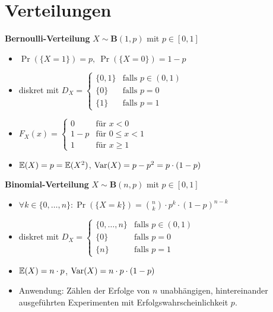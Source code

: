 \section{Verteilungen}

\textbf{Bernoulli-Verteilung} $X\sim\mathbf{B}(1,p)$ mit $p \in [0,1]$
\begin{itemize}
\item $\Pr(\{X=1\}) = p,\ \Pr(\{X=0\}) = 1-p$

\item diskret mit $D_X = \begin{cases}
  \{0,1\}  & \text{falls } p \in (0,1) \\
  \{0\}    & \text{falls } p = 0       \\
  \{1\}    & \text{falls } p = 1
  \end{cases}$

\item $F_X(x) = \begin{cases}
  0    & \text{für } x < 0        \\
  1-p  & \text{für } 0 \leq x <1  \\
  1    & \text{für } x \geq 1
  \end{cases}$

\item $\mathbb{E}(X) = p = \mathbb{E}(X^2)$, $\operatorname{Var}(X) = p-p^2 = p \cdot (1-p)$

\end{itemize}

\textbf{Binomial-Verteilung} $X\sim\mathbf{B}(n,p)$ mit $p \in [0,1]$
\begin{itemize}
\item $\forall k\in\{0,\ldots,n\}\!:
  \Pr(\{X=k\}) = \binom{n}{k} \cdot p^k\cdot (1-p)^{n-k}$

\item diskret mit
  $D_X = \begin{cases}
  \{0,\ldots,n\}  & \text{falls } p \in (0,1)  \\
  \{0\}           & \text{falls } p = 0        \\
  \{n\}           & \text{falls } p = 1
  \end{cases}$

\item $\mathbb{E}(X) = n \cdot p$, $\operatorname{Var}(X) = n \cdot p \cdot (1-p)$

\item Anwendung: Zählen der Erfolge von $n$ unabhängigen, hintereinander
  ausgeführten Experimenten mit Erfolgswahrscheinlichkeit $p$.
\end{itemize}

